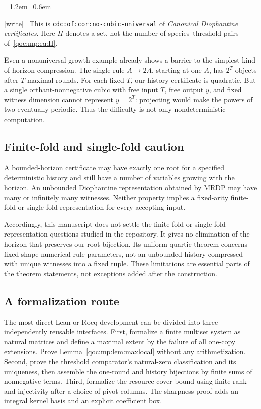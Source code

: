 \documentclass[11pt,letterpaper]{article}
\theoremstyle{definition}
\theoremstyle{remark}
\newcommand{\wtag}{\textup{[write]}}
\newenvironment{writenote}{\par\smallskip\begin{list}{}{\leftmargin=1.2em\rightmargin=0.6em}\item[]\small\wtag\ }{\end{list}\smallskip}
\newcommand{\lab}[1]{\nolinkurl{#1}}
\begin{document}
\begin{writenote}
This is \lab{cdc:of:cor:no-cubic-universal} of \emph{Canonical Diophantine certificates}. Here $H$ denotes a set, not the number of species--threshold pairs of~\eqref{qoc:mp:eq:H}.
\end{writenote}

Even a nonuniversal growth example already shows a barrier to the simplest
kind of horizon compression. The single rule $A\to2A$, starting at one
$A$, has $2^T$ objects after $T$ maximal rounds. For each fixed $T$, our
history certificate is quadratic. But a single orthant-nonnegative cubic
with free input $T$, free output $y$, and fixed witness dimension cannot
represent $y=2^T$: projecting would make the powers of two eventually
periodic. Thus the difficulty is not only nondeterministic computation.

\subsection{Finite-fold and single-fold caution}
A bounded-horizon certificate may have exactly one root for a specified
deterministic history and still have a number of variables growing with
the horizon. An unbounded Diophantine representation obtained by MRDP may
have many or infinitely many witnesses. Neither property implies a
fixed-arity finite-fold or single-fold representation for every accepting
input.

Accordingly, this manuscript does not settle the finite-fold or
single-fold representation questions studied in the repository. It gives
no elimination of the horizon that preserves our root bijection. Its
uniform quartic theorem concerns fixed-shape numerical rule parameters,
not an unbounded history compressed with unique witnesses into a fixed
tuple. These limitations are essential parts of the theorem statements,
not exceptions added after the construction.

\subsection{A formalization route}
The most direct Lean or Rocq development can be divided into three
independently reusable interfaces. First, formalize a finite multiset
system as natural matrices and define a maximal extent by the failure of
all one-copy extensions. Prove Lemma~\ref{qoc:mp:lem:maxlocal} without any
arithmetization. Second, prove the threshold comparator's natural-zero
classification and its uniqueness, then assemble the one-round and
history bijections by finite sums of nonnegative terms. Third, formalize
the resource-cover bound using finite rank and injectivity after a choice
of pivot columns. The sharpness proof adds an integral kernel basis and
an explicit coefficient box.
\end{document}

